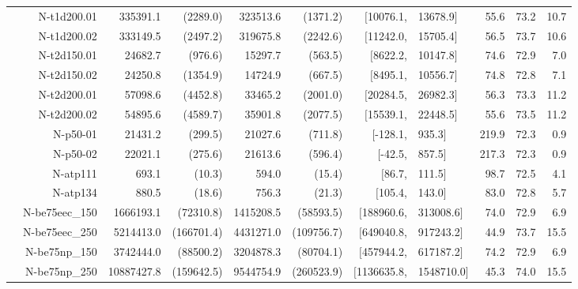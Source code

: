 \documentclass[runningheads]{llncs}
\begin{document}
\begin{table}[tb]
{\begin{tabular}{r@{\hskip -2ex}*{5}{r}rl*{3}{r}}
     & N-t1d200.01      & 335391.1                & (2289.0)   & 323513.6  & (1371.2)               & $[$10076.1,   & 13678.9$]$    & 55.6 & 73.2 & 10.7 \\
     & N-t1d200.02      & 333149.5                & (2497.2)   & 319675.8  & (2242.6)               & $[$11242.0,   & 15705.4$]$    & 56.5 & 73.7 & 10.6 \\
     & N-t2d150.01      & 24682.7                 & (976.6)    & 15297.7   & (563.5)                & $[$8622.2,    & 10147.8$]$    & 74.6 & 72.9 & 7.0  \\
     & N-t2d150.02      & 24250.8                 & (1354.9)   & 14724.9   & (667.5)                & $[$8495.1,    & 10556.7$]$    & 74.8 & 72.8 & 7.1  \\
     & N-t2d200.01      & 57098.6                 & (4452.8)   & 33465.2   & (2001.0)               & $[$20284.5,   & 26982.3$]$    & 56.3 & 73.3 & 11.2 \\
     & N-t2d200.02      & 54895.6                 & (4589.7)   & 35901.8   & (2077.5)               & $[$15539.1,   & 22448.5$]$    & 55.6 & 73.5 & 11.2 \\
     & N-p50-01         & 21431.2                 & (299.5)    & 21027.6   & (711.8)                & $[$-128.1,    & 935.3$]$      & 219.9& 72.3 & 0.9  \\
     & N-p50-02         & 22021.1                 & (275.6)    & 21613.6   & (596.4)                & $[$-42.5,     & 857.5$]$      & 217.3& 72.3 & 0.9  \\
     & N-atp111         & 693.1                   & (10.3)     & 594.0     & (15.4)                 & $[$86.7,      & 111.5$]$      & 98.7 & 72.5 & 4.1  \\
     & N-atp134         & 880.5                   & (18.6)     & 756.3     & (21.3)                 & $[$105.4,     & 143.0$]$      & 83.0 & 72.8 & 5.7  \\
     & N-be75eec\_150   & 1666193.1               & (72310.8)  & 1415208.5 & (58593.5)              & $[$188960.6,  & 313008.6$]$   & 74.0 & 72.9 & 6.9  \\
     & N-be75eec\_250   & 5214413.0               & (166701.4) & 4431271.0 & (109756.7)             & $[$649040.8,  & 917243.2$]$   & 44.9 & 73.7 & 15.5 \\
     & N-be75np\_150    & 3742444.0               & (88500.2)  & 3204878.3 & (80704.1)              & $[$457944.2,  & 617187.2$]$   & 74.2 & 72.9 & 6.9  \\
     & N-be75np\_250    & 10887427.8              & (159642.5) & 9544754.9 & (260523.9)             & $[$1136635.8, & 1548710.0$]$  & 45.3 & 74.0 & 15.5 \\\midrule

\end{tabular}}
\end{table}
\end{document}
